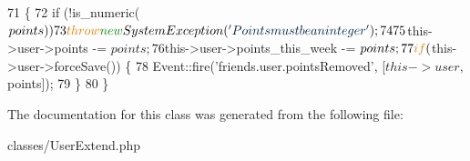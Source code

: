 \begin{DoxyCode}
71     \{
72         \textcolor{keywordflow}{if} (!is\_numeric($points))
73             \textcolor{keywordflow}{throw} \textcolor{keyword}{new} SystemException(\textcolor{stringliteral}{'Points must be an integer'});
74 
75         $this->user->points -= $points;
76         $this->user->points\_this\_week -= $points;
77         \textcolor{keywordflow}{if} ($this->user->forceSave()) \{
78             Event::fire(\textcolor{stringliteral}{'friends.user.pointsRemoved'}, [$this->user, $points]);
79         \}
80     \}
\end{DoxyCode}


The documentation for this class was generated from the following file\+:\begin{DoxyCompactItemize}
\item 
classes/User\+Extend.\+php\end{DoxyCompactItemize}
